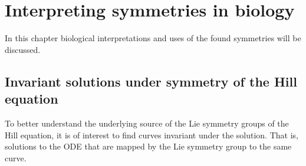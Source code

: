 \chapter{Interpreting symmetries in biology}

In this chapter biological interpretations and uses of the found symmetries will be discussed.

\section{Invariant solutions under symmetry of the Hill equation}

To better understand the underlying source of the Lie symmetry groups of the Hill equation, it is of interest to find curves invariant under the solution.
That is, solutions to the ODE that are mapped by the Lie symmetry group to the same curve.

